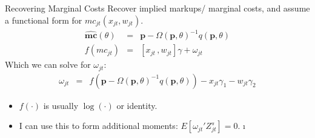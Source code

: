 \documentclass[aspectratio=169,11pt]{beamer}
\begin{document}
\begin{frame}{Recovering Marginal Costs }
Recover implied markups/ marginal costs, and assume a functional form for $mc_{jt}(x_{jt},w_{jt})$.
\begin{eqnarray*}
\widehat{\symbf{mc}}(\theta)&=& \symbf{p}- \Omega(\symbf{p},\theta)^{-1} q(\symbf{p},\theta)\\
f(mc_{jt}) &=& [x_{jt} \,, w_{jt}] \gamma + \omega_{jt}
\end{eqnarray*}
Which we can solve for $\omega_{jt}$:
\begin{eqnarray*}
\omega_{jt} &=&  f(\symbf{p}- \Omega(\symbf{p},\theta)^{-1} q(\symbf{p},\theta)) - x_{jt} \gamma_1 - w_{jt} \gamma_2
\end{eqnarray*}
\begin{itemize}
\item $f(\cdot)$ is usually $\log(\cdot)$ or identity.
\item I can use this to form additional moments: $E[\omega_{jt}' Z_{jt}^{s}]=0$.
\i%
\end{itemize}
\end{frame}
\end{document}
